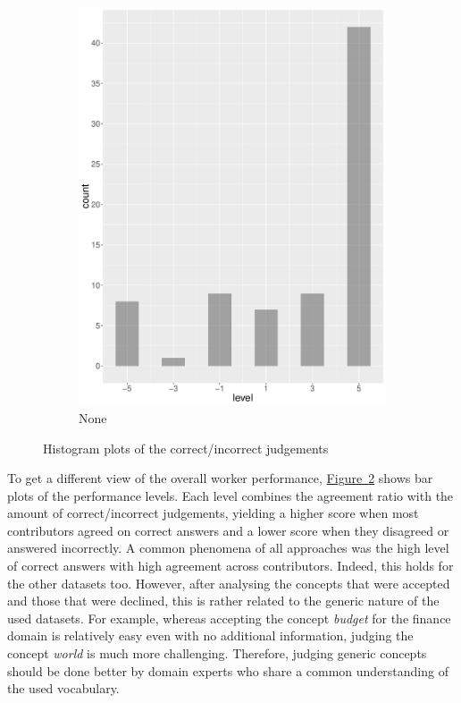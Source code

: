 \begin{figure}
\begin{subfigure}[b]{0.4\textwidth}
        \includegraphics[width=\textwidth]{plots/finance/hist_level_none}
        \caption{None}
        \label{fig:hist_level_finance_none}
    \end{subfigure}
    \caption{Histogram plots of the correct/incorrect judgements}\label{fig:hist_level_finance_all}
\end{figure}

To get a different view of the overall worker performance, \hyperref[fig:hist_level_finance_all]{Figure~\ref*{fig:hist_level_finance_all}} 
shows bar plots of the performance levels. Each level combines the agreement ratio with the amount of correct/incorrect judgements, yielding a higher score when most contributors agreed on correct answers and a lower score when they disagreed or answered incorrectly.
A common phenomena of all approaches was the high level of correct answers with high agreement across contributors. Indeed, this holds for the other datasets too. However, after analysing the concepts that were accepted and those that were declined, this is rather related to the generic nature of the used datasets. For example, whereas accepting the concept \emph{budget} for the finance domain is relatively easy even with no additional information, judging the concept \emph{world} is much more challenging. Therefore, judging generic concepts should be done better by domain experts who share a common understanding of the used vocabulary. 

